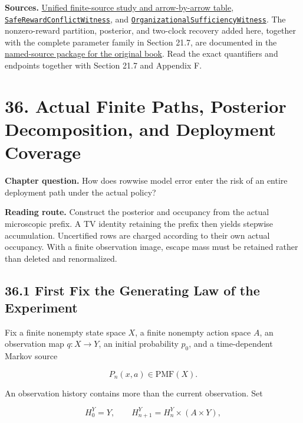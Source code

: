 \documentclass[
  english,
  11pt,
  oneside]{book}
\newcounter{none} %
\begin{document}
\textbf{Sources.} \href{../formalization/ueot-core/docs/compression/theory_completion/unified_closure/interface_research_v1/UNIFIED_FINITE_SOURCE_EXAMPLE.md}{Unified finite-source study and arrow-by-arrow table}, \href{../formalization/ueot-core/UEOT/V3/Compression/TheoryCompletion/UnifiedClosure/SafeRewardConflictWitness.lean}{\nolinkurl{SafeRewardConflictWitness}}, and \href{../formalization/ueot-core/UEOT/V3/Compression/TheoryCompletion/UnifiedClosure/OrganizationalSufficiencyWitness.lean}{\nolinkurl{OrganizationalSufficiencyWitness}}. The nonzero-reward partition, posterior, and two-clock recovery added here, together with the complete parameter family in Section 21.7, are documented in the \href{../formalization/ueot-core/docs/compression/theory_completion/unified_closure/conflict_family_book_source_v1/RESULTS_AND_OPEN_OBLIGATIONS.md}{named-source package for the original book}. Read the exact quantifiers and endpoints together with Section 21.7 and Appendix F.

\chapter{36. Actual Finite Paths, Posterior Decomposition, and Deployment Coverage}\label{ch-36}

\textbf{Chapter question.} How does rowwise model error enter the risk of an entire deployment path under the actual policy?

\textbf{Reading route.} Construct the posterior and occupancy from the actual microscopic prefix. A TV identity retaining the prefix then yields stepwise accumulation. Uncertified rows are charged according to their own actual occupancy. With a finite observation image, escape mass must be retained rather than deleted and renormalized.

\section{36.1 First Fix the Generating Law of the Experiment}\label{first-fix-the-generating-law-of-the-experiment}

Fix a finite nonempty state space \(X\), a finite nonempty action space \(A\), an observation map \(q:X\to Y\), an initial probability \(p_0\), and a time-dependent Markov source

\[P_n(x,a)\in\mathrm{PMF}(X).\]

An observation history contains more than the current observation. Set

\[H_0^Y=Y,\qquad H_{n+1}^Y=H_n^Y\times(A\times Y),\]
\end{document}
